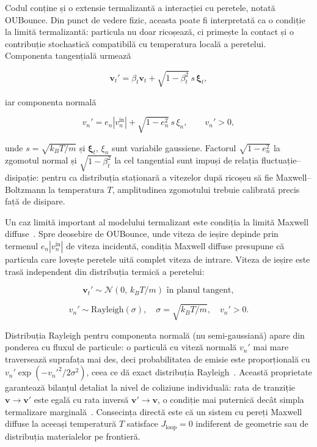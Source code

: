 \documentclass[12pt,openright,twoside]{book}
\begin{document}
Codul conține și o extensie termalizantă a interacției cu peretele, notată OUBounce. Din punct de vedere fizic, aceasta poate fi interpretată ca o condiție la limită termalizantă: particula nu doar ricoșează, ci primește la contact și o contribuție stochastică compatibilă cu temperatura locală a peretelui. Componenta tangențială urmează

\begin{equation}
    \mathbf{v}_t' = \beta_t\mathbf{v}_t + \sqrt{1-\beta_t^2}\,s\,\boldsymbol{\xi}_t,
\end{equation}

iar componenta normală

\begin{equation}
    v_n' = e_n |v_n^{\text{in}}| + \sqrt{1-e_n^2}\,s\,\xi_n,
    \qquad v_n' > 0,
\end{equation}

unde $s=\sqrt{k_B T / m}$ și $\boldsymbol{\xi}_t$, $\xi_n$ sunt variabile gaussiene. Factorul $\sqrt{1-e_n^2}$ la zgomotul normal și $\sqrt{1-\beta_t^2}$ la cel tangential sunt impuși de relația fluctuație--disipație: pentru ca distribuția staționară a vitezelor după ricoșeu să fie Maxwell--Boltzmann la temperatura $T$, amplitudinea zgomotului trebuie calibrată precis față de disipare.

Un caz limită important al modelului termalizant este condiția la limită Maxwell diffuse~\cite{maxwell1879,cercignani1988}. Spre deosebire de OUBounce, unde viteza de ieșire depinde prin termenul $e_n|v_n^\text{in}|$ de viteza incidentă, condiția Maxwell diffuse presupune că particula care lovește peretele uită complet viteza de intrare. Viteza de ieșire este trasă independent din distribuția termică a peretelui:

\begin{equation}
    \mathbf{v}_t' \sim \mathcal{N}(0,\, k_BT/m)\text{ în planul tangent},
    \label{eq:maxwell_diffuse_t}
\end{equation}

\begin{equation}
    v_n' \sim \text{Rayleigh}(\sigma),\quad \sigma = \sqrt{k_BT/m},\quad v_n' > 0.
    \label{eq:maxwell_diffuse_n}
\end{equation}

Distribuția Rayleigh pentru componenta normală (nu semi-gaussiană) apare din ponderea cu fluxul de particule: o particulă cu viteză normală $v_n'$ mai mare traversează suprafața mai des, deci probabilitatea de emisie este proporțională cu $v_n' \exp(-v_n'^2/2\sigma^2)$, ceea ce dă exact distribuția Rayleigh~\cite{cercignani1988,kogan1969}. Această proprietate garantează bilanțul detaliat la nivel de coliziune individuală: rata de tranziție $\mathbf{v} \to \mathbf{v}'$ este egală cu rata inversă $\mathbf{v}' \to \mathbf{v}$, o condiție mai puternică decât simpla termalizare marginală~\cite{cercignani1971,maes2021}. Consecința directă este că un sistem cu pereți Maxwell diffuse la aceeași temperatură $T$ satisface $J_\text{loop} = 0$ indiferent de geometrie sau de distribuția materialelor pe frontieră.
\end{document}
